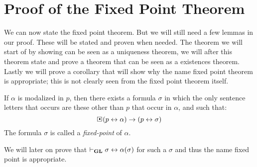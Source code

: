 \documentclass[../main.tex]{subfiles}
\begin{document}
\section{Proof of the Fixed Point Theorem}

We can now state the fixed point theorem. But we will still need a few lemmas
in our proof. These will be stated and proven when needed. The theorem we will
start of by showing can be seen as a uniqueness theorem, we will after this
theorem state and prove a theorem that can be seen as a existences theorem.
Lastly we will prove a corollary that will show why the name fixed point
theorem is appropriate; this is not clearly seen from the fixed point theorem
itself.

\begin{thm}
	\label{thm:Fixed}
	If $\alpha$ is modalized in $p$, then there exists a formula $\sigma$
	in which the only sentence letters that occurs are these other than $p$
	that occur in $\alpha$, and such that:
	\[\sBox(p\leftrightarrow\alpha)\rightarrow(p\leftrightarrow\sigma)\]
	The formula $\sigma$ is called a \textit{fixed-point} of $\alpha$.
\end{thm}
We will later on prove that $\vdash_{\text{\textbf{GL}}}\sigma\leftrightarrow\alpha(\sigma)$ for
such a $\sigma$ and thus the name fixed point is appropriate.
\end{document}
